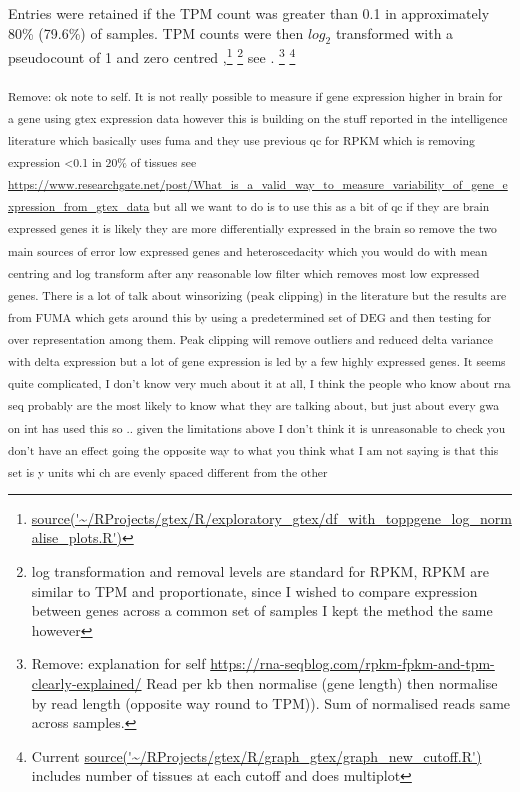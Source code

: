 Entries were retained if the TPM count was greater than 0.1 in approximately 80\% (79.6\%) of samples. TPM counts were then $log_2$ transformed with a pseudocount of 1 and zero centred  \cite{sniekers2017genome},\cite{taskesen20162d}\cite{mele2015human}\footnote{\url{source('~/RProjects/gtex/R/exploratory_gtex/df_with_toppgene_log_normalise_plots.R')}} \footnote{log transformation and removal levels are standard for RPKM, RPKM are similar to TPM and proportionate, since I wished to compare expression between genes across a common set of samples I kept the method the same however} see \cite{zhao2017gene}. \footnote{Remove: explanation for self \url{https://rna-seqblog.com/rpkm-fpkm-and-tpm-clearly-explained/} Read per kb then normalise (gene length) then normalise by read length (opposite way round to TPM)). Sum of normalised reads same across samples. } \footnote{Current \url{source('~/RProjects/gtex/R/graph_gtex/graph_new_cutoff.R')} includes number of tissues at each cutoff and does multiplot}

\textsubscript{Remove: ok note to self. It is not really possible to measure if gene expression higher in brain for a gene using gtex expression data however this is building on the stuff reported in the intelligence literature which basically uses fuma and they use previous qc for RPKM which is removing expression <0.1 in 20\% of tissues see \url{https://www.researchgate.net/post/What_is_a_valid_way_to_measure_variability_of_gene_expression_from_gtex_data} but all we want to do is to use this as a bit of qc if they are brain expressed genes it is likely they are more differentially expressed in the brain so remove the two main sources of error low expressed genes and heteroscedacity which you would do with mean centring and log transform after any reasonable low filter which removes most low expressed genes. There is a lot of talk about winsorizing (peak clipping) in the literature but the results are from FUMA which gets around this by using a predetermined set of DEG and then testing for over representation among them. Peak clipping will remove outliers and reduced delta variance with delta expression but a lot of gene expression is led by a few highly expressed genes. It seems quite complicated, I don't know very much about it at all, I think the people who know about rna seq probably are the most likely to know what they are talking about, but just about every gwa on int has used this so .. given the limitations above I don't think it is unreasonable to check you don't have an effect going the opposite way to what you think what I am not saying is that this set is y units whi
ch are evenly spaced different from the other}


